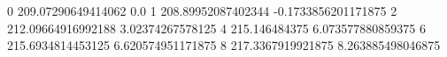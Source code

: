 0 209.07290649414062 0.0
1 208.89952087402344 -0.1733856201171875
2 212.09664916992188 3.02374267578125
4 215.146484375 6.073577880859375
6 215.6934814453125 6.620574951171875
8 217.3367919921875 8.263885498046875
